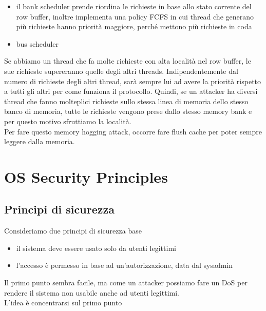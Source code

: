 \documentclass[12pt, oneside]{extbook} %
\begin{document}
\begin{itemize}
\item il bank scheduler prende riordina le richieste in base allo stato corrente del row buffer, inoltre implementa una policy FCFS in cui thread che generano più richieste hanno priorità maggiore, perché mettono più richieste in coda
\item bus scheduler 
\end{itemize}
Se abbiamo un thread che fa molte richieste con alta località nel row buffer, le sue richieste supereranno quelle degli altri threads. Indipendentemente dal numero di richieste degli altri thread, sarà sempre lui ad avere la priorità rispetto a tutti gli altri per come funziona il protocollo. Quindi, se un attacker ha diversi thread che fanno molteplici richieste sullo stessa linea di memoria dello stesso banco di memoria, tutte le richieste vengono prese dallo stesso memory bank e per questo motivo sfruttiamo la località.\\Per fare questo memory hogging attack, occorre fare flush cache per poter sempre leggere dalla memoria.


\chapter{OS Security Principles}

\section{Principi di sicurezza}
Consideriamo due principi di sicurezza base
\begin{itemize}
\item il sistema deve essere usato solo da utenti legittimi
\item l'accesso è permesso in base ad un'autorizzazione, data dal sysadmin
\end{itemize}
Il primo punto sembra facile, ma come un attacker possiamo fare un DoS per rendere il sistema non usabile anche ad utenti legittimi.\\L'idea è concentrarsi sul primo punto
\end{document}
